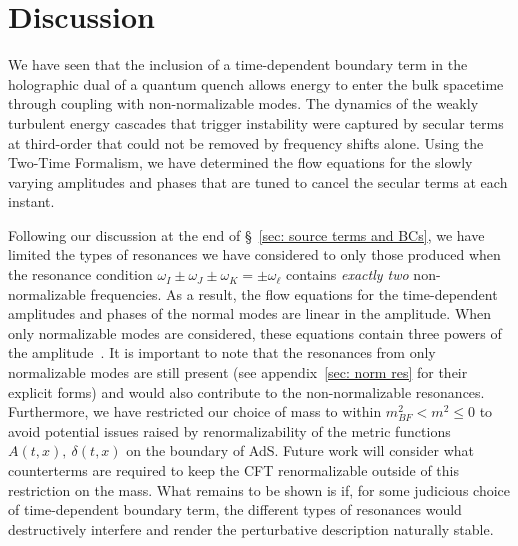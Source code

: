 \documentclass[letterpaper,11pt]{article}
\begin{document}

\section{Discussion}
\label{sec: discussion}

We have seen that the inclusion of a time-dependent boundary term in the holographic dual of a quantum quench allows energy to enter the bulk spacetime through coupling with non-normalizable modes. The dynamics of the weakly turbulent energy cascades that trigger instability were captured by secular terms at third-order that could not be removed by frequency shifts alone. Using the Two-Time Formalism, we have determined the flow equations for the slowly varying amplitudes and phases that are tuned to cancel the secular terms at each instant. 

Following our discussion at the end of \S\!~\ref{sec: source terms and BCs}, we have limited the types of resonances we have considered to only those produced when the resonance condition ${\omega_I \pm \omega_J \pm \omega_K = \pm \omega_\ell}$ contains \emph{exactly two} non-normalizable frequencies. As a result, the flow equations for the time-dependent amplitudes and phases of the normal modes are linear in the amplitude. When only normalizable modes are considered, these equations contain three powers of the amplitude~\cite{1403.6471, 1407.6273}. It is important to note that the resonances from only normalizable modes are still present (see appendix~\ref{sec: norm res} for their explicit forms) and would also contribute to the non-normalizable resonances. Furthermore, we have restricted our choice of mass to within $m_{BF}^2 < m^2 \leq 0$ to avoid potential issues raised by renormalizability of the metric functions ${A(t,x),~\delta(t,x)}$ on the boundary of AdS. Future work will consider what counterterms are required to keep the CFT renormalizable outside of this restriction on the mass. What remains to be shown is if, for some judicious choice of time-dependent boundary term, the different types of resonances would destructively interfere and render the perturbative description naturally stable. 
\end{document}
